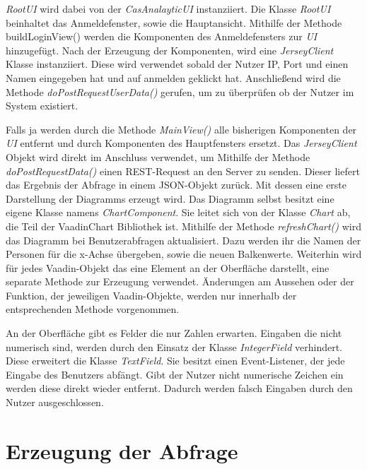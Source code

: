 \textit{RootUI} wird dabei von der \textit{CasAnalayticUI} instanziiert. Die Klasse \textit{RootUI} beinhaltet das Anmeldefenster, sowie die Hauptansicht. Mithilfe der Methode buildLoginView() werden die Komponenten des Anmeldefensters zur \textit{UI} hinzugefügt. Nach der Erzeugung der Komponenten, wird eine \textit{JerseyClient} Klasse instanziiert. Diese wird verwendet sobald der Nutzer IP, Port und einen Namen eingegeben hat und auf anmelden geklickt hat. Anschließend wird die Methode \textit{doPostRequestUserData()} gerufen, um zu überprüfen ob der Nutzer im System existiert. 

Falls ja werden durch die Methode \textit{MainView()} alle bisherigen Komponenten der \textit{UI} entfernt und durch Komponenten des Hauptfensters ersetzt. Das \textit{JerseyClient} Objekt wird direkt im Anschluss verwendet, um Mithilfe der Methode \textit{doPostRequestData()} einen REST-Request an den Server zu senden. Dieser liefert das Ergebnis der Abfrage in einem JSON-Objekt zurück. Mit dessen eine erste Darstellung der Diagramms erzeugt wird. Das Diagramm selbst besitzt eine eigene Klasse namens \textit{ChartComponent}. Sie leitet sich von der Klasse \textit{Chart} ab, die Teil der VaadinChart Bibliothek ist. Mithilfe der Methode \textit{refreshChart()} wird das Diagramm bei Benutzerabfragen aktualisiert. Dazu werden ihr die Namen der Personen für die x-Achse übergeben, sowie die neuen Balkenwerte. Weiterhin wird für jedes Vaadin-Objekt das eine Element an der Oberfläche darstellt, eine separate Methode zur Erzeugung verwendet. Änderungen am Aussehen oder der Funktion, der jeweiligen Vaadin-Objekte, werden nur innerhalb der entsprechenden Methode vorgenommen.

An der Oberfläche gibt es Felder die nur Zahlen erwarten. Eingaben die nicht numerisch sind, werden durch den Einsatz der Klasse \textit{IntegerField} verhindert. Diese erweitert die Klasse \textit{TextField}. Sie besitzt einen Event-Listener, der jede Eingabe des Benutzers abfängt. Gibt der Nutzer nicht numerische Zeichen ein werden diese direkt wieder entfernt. Dadurch werden falsch Eingaben durch den Nutzer ausgeschlossen.

\section{Erzeugung der Abfrage}

